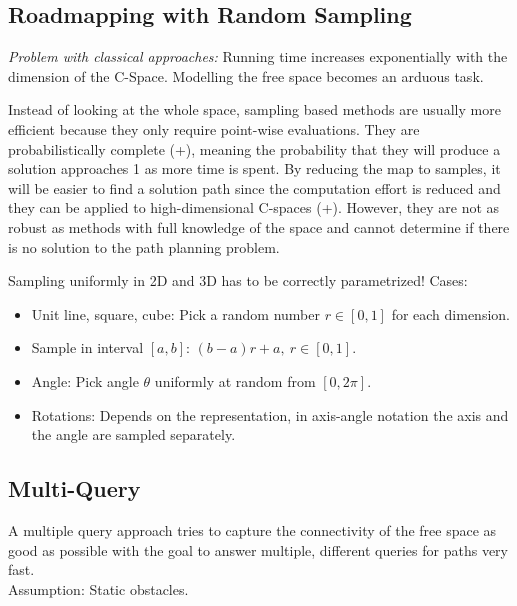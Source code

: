 \begin{multicols*}{2}
\section{Roadmapping with Random Sampling}
\textit{Problem with classical approaches:} Running time increases exponentially with the dimension of the C-Space. Modelling the free space becomes an arduous task.\par
Instead of looking at the whole space, sampling based methods are usually more efficient because they only require point-wise evaluations.
They are probabilistically complete (+), meaning the probability that they will produce a solution approaches 1 as more time is spent.
By reducing the map to samples, it will be easier to find a solution path since the computation effort is reduced and they can be applied to high-dimensional C-spaces (+).
However, they are not as robust as methods with full knowledge of the space and cannot determine if there is no solution to the path planning problem.\par

Sampling uniformly in 2D and 3D has to be correctly parametrized! Cases:
\begin{itemize}
	\item Unit line, square, cube: Pick a random number $r \in [0, 1]$
	for each dimension.
	\item Sample in interval $[a,b]$: $(b-a)r + a, \ r \in [0, 1]$.
	\item Angle: Pick angle $\theta$ uniformly at random from $[0, 2\pi]$.
	\item Rotations: Depends on the representation, in axis-angle notation the axis and the angle are sampled separately.
\end{itemize}


\subsection{Multi-Query}
A multiple query approach tries to capture the connectivity of the free space as good as possible with the goal to answer multiple, different queries for paths very fast.\\
Assumption: Static obstacles.


\end{multicols*}
